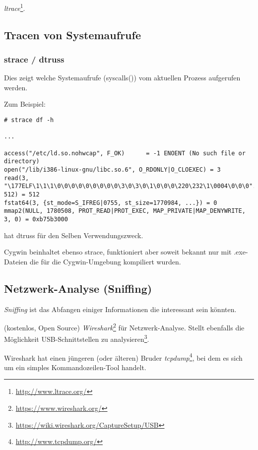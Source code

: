 \emph{ltrace}\footnote{\url{http://www.ltrace.org/}}.

\subsection{Tracen von Systemaufrufe}

\label{strace}
\subsubsection{strace / dtruss}

Dies zeigt welche Systemaufrufe (syscalls()) vom aktuellen Prozess aufgerufen werden.

Zum Beispiel:

\begin{lstlisting}
# strace df -h

...

access("/etc/ld.so.nohwcap", F_OK)      = -1 ENOENT (No such file or directory)
open("/lib/i386-linux-gnu/libc.so.6", O_RDONLY|O_CLOEXEC) = 3
read(3, "\177ELF\1\1\1\0\0\0\0\0\0\0\0\0\3\0\3\0\1\0\0\0\220\232\1\0004\0\0\0"..., 512) = 512
fstat64(3, {st_mode=S_IFREG|0755, st_size=1770984, ...}) = 0
mmap2(NULL, 1780508, PROT_READ|PROT_EXEC, MAP_PRIVATE|MAP_DENYWRITE, 3, 0) = 0xb75b3000
\end{lstlisting}

\myindex{\MacOSX}
\MacOSX hat dtruss für den Selben Verwendungszweck.

Cygwin beinhaltet ebenso strace, funktioniert aber soweit bekannt nur mit .exe-Dateien
die für die Cygwin-Umgebung kompiliert wurden.

\subsection{Netzwerk-Analyse (Sniffing)}

\emph{Sniffing} ist das Abfangen einiger Informationen die interessant sein könnten.

(kostenlos, Open Source) \emph{Wireshark}\footnote{\url{https://www.wireshark.org/}} für Netzwerk-Analyse.
Stellt ebenfalls die Möglichkeit USB-Schnittstellen zu analysieren\footnote{\url{https://wiki.wireshark.org/CaptureSetup/USB}}.

Wireshark hat einen jüngeren (oder älteren) Bruder \emph{tcpdump}\footnote{\url{http://www.tcpdump.org/}},
bei dem es sich um ein simples Kommandozeilen-Tool handelt.

